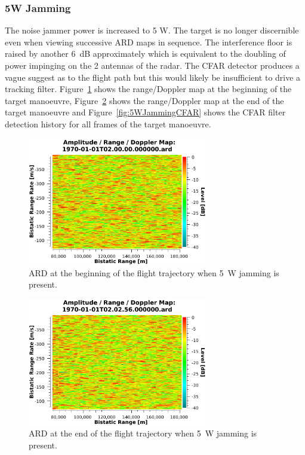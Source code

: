 \documentclass[english, 12pt]{report}
\begin{document}
\clearpage

\subsubsection{5W Jamming}
The noise jammer power is increased to 5 W. The target is no longer discernible even when viewing successive ARD maps in sequence. The interference floor is raised by another 6~dB approximately which is equivalent to the doubling of power impinging on the 2 antennas of the radar. The CFAR detector produces a vague suggest as to the flight path but this would likely be insufficient to drive a tracking filter. Figure~\ref{fig:5WJammingARDFirst} shows the range/Doppler map at the beginning of the target manoeuvre, Figure~\ref{fig:5WJammingARDLast} shows the range/Doppler map at the end of the target manoeuvre and Figure~\ref{fig:5WJammingCFAR} shows the CFAR filter detection history for all frames of the target manoeuvre.

\begin{figure}[htbp]
\begin{center}
\includegraphics[width=0.7\textwidth]{figs/Simulations/5WJammingARDFirst.pdf}
\caption{ARD at the beginning of the flight trajectory when 5~W jamming is present.}
\label{fig:5WJammingARDFirst}
\end{center}
\end{figure}

\begin{figure}[htbp]
\begin{center}
\includegraphics[width=0.7\textwidth]{figs/Simulations/5WJammingARDLast.pdf}
\caption{ARD at the end of the flight trajectory when 5~W jamming is present.}
\label{fig:5WJammingARDLast}
\end{center}
\end{figure}
\end{document}
